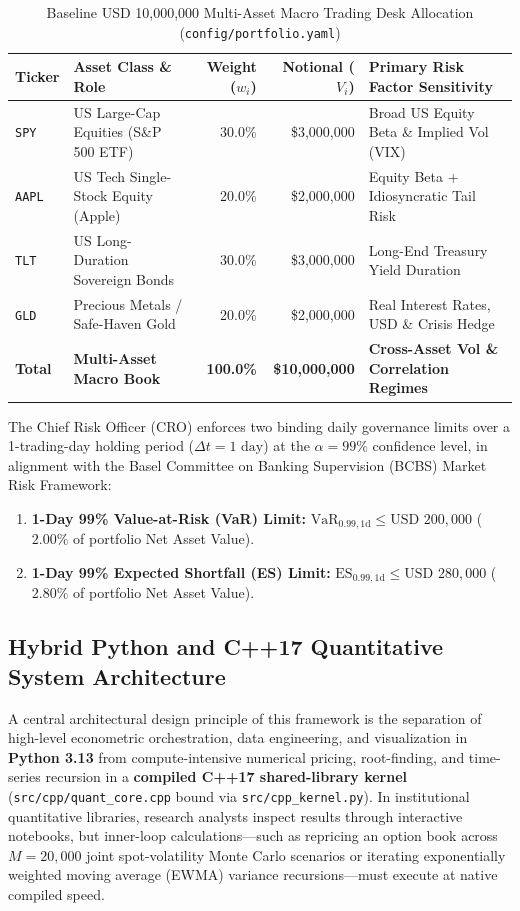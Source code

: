 \documentclass[11pt,a4paper]{article}
\begin{document}
\begin{table}[H]
\centering
\caption{Baseline USD 10,000,000 Multi-Asset Macro Trading Desk Allocation (\texttt{config/portfolio.yaml})}
\small
\begin{tabular}{llrrl}
\toprule
\textbf{Ticker} & \textbf{Asset Class \& Role} & \textbf{Weight ($w_i$)} & \textbf{Notional ($V_i$)} & \textbf{Primary Risk Factor Sensitivity} \\
\midrule
\texttt{SPY} & US Large-Cap Equities (S\&P 500 ETF) & 30.0\% & \$3,000,000 & Broad US Equity Beta \& Implied Vol (VIX) \\
\texttt{AAPL} & US Tech Single-Stock Equity (Apple) & 20.0\% & \$2,000,000 & Equity Beta + Idiosyncratic Tail Risk \\
\texttt{TLT} & US Long-Duration Sovereign Bonds & 30.0\% & \$3,000,000 & Long-End Treasury Yield Duration \\
\texttt{GLD} & Precious Metals / Safe-Haven Gold & 20.0\% & \$2,000,000 & Real Interest Rates, USD \& Crisis Hedge \\
\midrule
\textbf{Total} & \textbf{Multi-Asset Macro Book} & \textbf{100.0\%} & \textbf{\$10,000,000} & \textbf{Cross-Asset Vol \& Correlation Regimes} \\
\bottomrule
\end{tabular}
\end{table}

The Chief Risk Officer (CRO) enforces two binding daily governance limits over a 1-trading-day holding period ($\Delta t = 1\text{ day}$) at the $\alpha = 99\%$ confidence level, in alignment with the Basel Committee on Banking Supervision (BCBS) Market Risk Framework:
\begin{enumerate}
    \item \textbf{1-Day 99\% Value-at-Risk (VaR) Limit:} $\text{VaR}_{0.99, 1\text{d}} \le \text{USD } 200,000$ ($2.00\%$ of portfolio Net Asset Value).
    \item \textbf{1-Day 99\% Expected Shortfall (ES) Limit:} $\text{ES}_{0.99, 1\text{d}} \le \text{USD } 280,000$ ($2.80\%$ of portfolio Net Asset Value).
\end{enumerate}

\subsection{Hybrid Python and C++17 Quantitative System Architecture}

A central architectural design principle of this framework is the separation of high-level econometric orchestration, data engineering, and visualization in \textbf{Python 3.13} from compute-intensive numerical pricing, root-finding, and time-series recursion in a \textbf{compiled C++17 shared-library kernel} (\texttt{src/cpp/quant\_core.cpp} bound via \texttt{src/cpp\_kernel.py}). In institutional quantitative libraries, research analysts inspect results through interactive notebooks, but inner-loop calculations---such as repricing an option book across $M = 20,000$ joint spot-volatility Monte Carlo scenarios or iterating exponentially weighted moving average (EWMA) variance recursions---must execute at native compiled speed.
\end{document}
